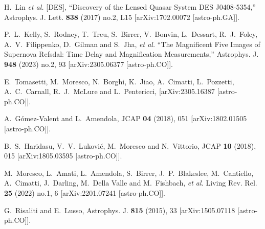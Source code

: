 \documentclass[aps,prl,10pt,twocolumn,superscriptaddress]{revtex4}
\begin{document}
\begin{thebibliography}{99}
H.~Lin \textit{et al.} [DES],
``Discovery of the Lensed Quasar System DES J0408-5354,''
Astrophys. J. Lett. \textbf{838} (2017) no.2, L15
[arXiv:1702.00072 [astro-ph.GA]].

P.~L.~Kelly, S.~Rodney, T.~Treu, S.~Birrer, V.~Bonvin, L.~Dessart, R.~J.~Foley, A.~V.~Filippenko, D.~Gilman and S.~Jha, \textit{et al.}
``The Magnificent Five Images of Supernova Refsdal: Time Delay and Magnification Measurements,''
Astrophys. J. \textbf{948} (2023) no.2, 93
[arXiv:2305.06377 [astro-ph.CO]].

E.~Tomasetti, M.~Moresco, N.~Borghi, K.~Jiao, A.~Cimatti, L.~Pozzetti, A.~C.~Carnall, R.~J.~McLure and L.~Pentericci,
[arXiv:2305.16387 [astro-ph.CO]].

A.~G\'omez-Valent and L.~Amendola,
JCAP \textbf{04} (2018), 051
[arXiv:1802.01505 [astro-ph.CO]].

B.~S.~Haridasu, V.~V.~Lukovi\'c, M.~Moresco and N.~Vittorio,
JCAP \textbf{10} (2018), 015
[arXiv:1805.03595 [astro-ph.CO]].

M.~Moresco, L.~Amati, L.~Amendola, S.~Birrer, J.~P.~Blakeslee, M.~Cantiello, A.~Cimatti, J.~Darling, M.~Della Valle and M.~Fishbach, \textit{et al.}
Living Rev. Rel. \textbf{25} (2022) no.1, 6
[arXiv:2201.07241 [astro-ph.CO]].


G.~Risaliti and E.~Lusso,
Astrophys. J. \textbf{815} (2015), 33
[arXiv:1505.07118 [astro-ph.CO]].


\end{thebibliography}
\end{document}
